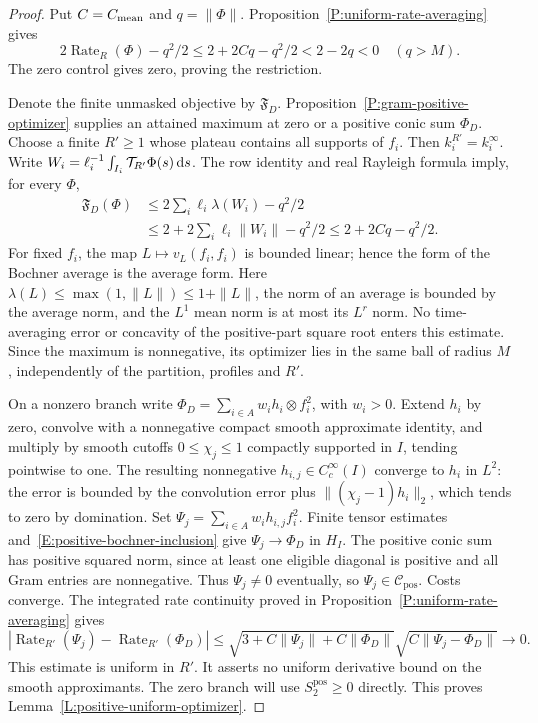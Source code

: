 \begin{proof}
  Put $C=C_{\rm mean}$ and $q=\|\Phi\|$.
  Proposition~\ref{P:uniform-rate-averaging} gives
  \[
    2\operatorname{Rate}_R(\Phi)-q^2/2
    \le2+2Cq-q^2/2<2-2q<0\quad(q>M).
  \]
  The zero control gives zero, proving the restriction.

  Denote the finite unmasked objective by $\mathfrak F_D$.
  Proposition~\ref{P:gram-positive-optimizer} supplies an attained
  maximum at zero or a positive conic sum $\Phi_D$.
  Choose a finite $R'\ge1$ whose plateau contains all supports of $f_i$.
  Then $k_i^{R'}=k_i^\infty$.
  Write $W_i=\ell_i^{-1}\int_{I_i}\mathcal T_{R'}\Phi(s)\,\mathrm{d} s$.
  The row identity and real Rayleigh formula imply, for every $\Phi$,
  \begin{align*}
    \mathfrak F_D(\Phi)
    &\le2\sum_i\ell_i\lambda(W_i)-q^2/2\\
    &\le2+2\sum_i\ell_i\|W_i\|-q^2/2
    \le2+2Cq-q^2/2 .
  \end{align*}
  For fixed $f_i$, the map $L\mapsto v_L(f_i,f_i)$ is bounded linear;
  hence the form of the Bochner average is the average form.
  Here $\lambda(L)\le\max(1,\|L\|)\le1+\|L\|$,
  the norm of an average is bounded by the average norm, and
  the $L^1$ mean norm is at most its $L^r$ norm.
  No time-averaging error or concavity of the positive-part square root
  enters this estimate. Since the maximum is nonnegative, its optimizer
  lies in the same ball of radius $M$, independently of the partition,
  profiles and $R'$.

  On a nonzero branch write
  $\Phi_D=\sum_{i\in A}w_i h_i\otimes f_i^2$, with $w_i>0$.
  Extend $h_i$ by zero, convolve with a nonnegative compact smooth
  approximate identity, and multiply by smooth cutoffs
  $0\le\chi_j\le1$ compactly supported in $I$, tending pointwise to one.
  The resulting nonnegative $h_{i,j}\in C_c^\infty(I)$ converge to $h_i$
  in $L^2$: the error is bounded by the convolution error plus
  $\|(\chi_j-1)h_i\|_2$, which tends to zero by domination.
  Set $\Psi_j=\sum_{i\in A}w_i h_{i,j}f_i^2$.
  Finite tensor estimates and~\eqref{E:positive-bochner-inclusion}
  give $\Psi_j\to\Phi_D$ in $H_I$.
  The positive conic sum has positive squared norm, since at least
  one eligible diagonal is positive and all Gram entries are nonnegative.
  Thus $\Psi_j\ne0$ eventually, so $\Psi_j\in\mathcal C_{\mathrm{pos}}$.
  Costs converge.
  The integrated rate continuity proved in
  Proposition~\ref{P:uniform-rate-averaging} gives
  \begin{equation}\label{E:positive-rate-continuity}
    |\operatorname{Rate}_{R'}(\Psi_j)-\operatorname{Rate}_{R'}(\Phi_D)|
    \le\sqrt{3+C\|\Psi_j\|+C\|\Phi_D\|}
    \sqrt{C\|\Psi_j-\Phi_D\|}\longrightarrow0 .
  \end{equation}
  This estimate is uniform in $R'$.
  It asserts no uniform derivative bound on the smooth approximants.
  The zero branch will use $S_2^{\mathrm{pos}}\ge0$ directly.
  This proves Lemma~\ref{L:positive-uniform-optimizer}.
\end{proof}

